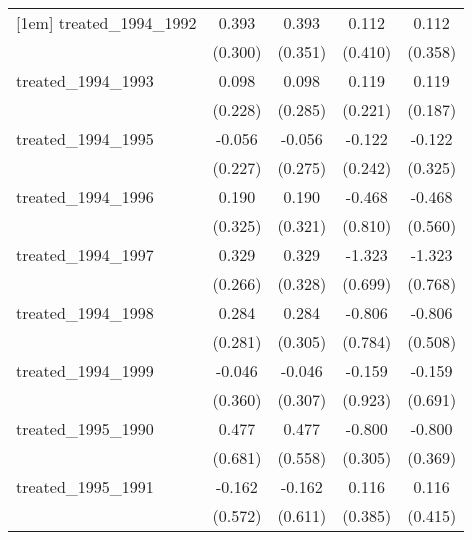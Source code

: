 {\begin{tabular}{l*{4}{c}}
[1em]
treated\_1994\_1992&       0.393         &       0.393         &       0.112         &       0.112         \\
            &     (0.300)         &     (0.351)         &     (0.410)         &     (0.358)         \\
[1em]
treated\_1994\_1993&       0.098         &       0.098         &       0.119         &       0.119         \\
            &     (0.228)         &     (0.285)         &     (0.221)         &     (0.187)         \\
[1em]
treated\_1994\_1995&      -0.056         &      -0.056         &      -0.122         &      -0.122         \\
            &     (0.227)         &     (0.275)         &     (0.242)         &     (0.325)         \\
[1em]
treated\_1994\_1996&       0.190         &       0.190         &      -0.468         &      -0.468         \\
            &     (0.325)         &     (0.321)         &     (0.810)         &     (0.560)         \\
[1em]
treated\_1994\_1997&       0.329         &       0.329         &      -1.323         &      -1.323         \\
            &     (0.266)         &     (0.328)         &     (0.699)         &     (0.768)         \\
[1em]
treated\_1994\_1998&       0.284         &       0.284         &      -0.806         &      -0.806         \\
            &     (0.281)         &     (0.305)         &     (0.784)         &     (0.508)         \\
[1em]
treated\_1994\_1999&      -0.046         &      -0.046         &      -0.159         &      -0.159         \\
            &     (0.360)         &     (0.307)         &     (0.923)         &     (0.691)         \\
[1em]
treated\_1995\_1990&       0.477         &       0.477         &      -0.800\sym{**} &      -0.800\sym{*}  \\
            &     (0.681)         &     (0.558)         &     (0.305)         &     (0.369)         \\
[1em]
treated\_1995\_1991&      -0.162         &      -0.162         &       0.116         &       0.116         \\
            &     (0.572)         &     (0.611)         &     (0.385)         &     (0.415)         \\

\end{tabular}}
